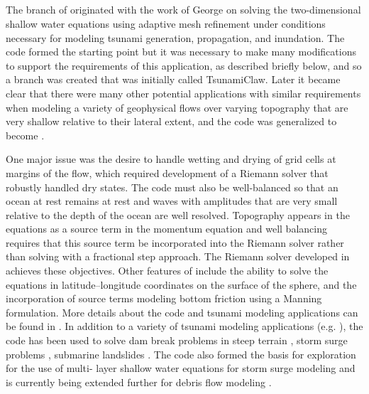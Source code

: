 %
%
%

\subsection{\geoclaw} 


The \geoclaw branch of \clawpack originated with the work of George
\cite{george:2006, George:2008aa} on solving the two-dimensional shallow water
equations using adaptive mesh refinement under conditions necessary for modeling
tsunami generation, propagation, and inundation. The \amrclaw code formed the
starting point but it was necessary to make many  modifications to support the
requirements of this application, as described briefly below, and so a branch
was created that was initially called TsunamiClaw.  Later it became clear that
there were many other potential applications with similar requirements when
modeling a variety of geophysical flows over varying topography that are very
shallow  relative to their lateral extent, and the code was generalized to
become \geoclaw.  

One major issue was the desire to handle wetting and drying of grid cells at
margins of the flow, which required development of a Riemann solver that
robustly handled dry states.  The code must also be well-balanced so that an
ocean at rest remains at rest and waves with amplitudes that are very small
relative to the depth of the ocean are well resolved.  Topography appears in the
equations as a source term in the momentum equation and well balancing requires
that this source term be incorporated into the Riemann solver rather than
solving with a fractional step approach.  The Riemann solver developed in
\cite{george:2006, George:2008aa} achieves these objectives. Other features of
\geoclaw include the ability to solve the equations in latitude--longitude
coordinates on the surface of the sphere, and the incorporation of source terms
modeling bottom friction using a Manning formulation. More details about the
code and tsunami modeling applications can be found in
\cite{Berger:2011vi,Berger:2011du}.  In addition to a variety of tsunami
modeling applications (e.g. \cite{??}), the \geoclaw code has been used to solve
dam break problems in steep terrain \cite{George:Malpasset}, storm surge
problems \cite{Mandli:ws}, submarine landslides .  The code also formed the basis for exploration for the use of  multi-
layer shallow water equations for storm surge modeling \cite{Mandli:2011te} and
is currently being extended further for debris flow modeling
\cite{Iverson:2014dc,George:2014gh}.

